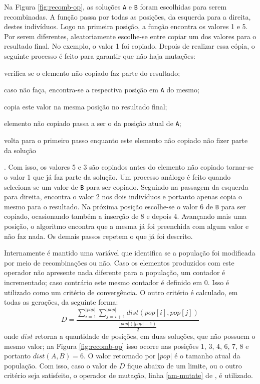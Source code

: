 Na Figura \ref{fig:recomb-op}, as soluções \verb!A! e \verb!B! foram
escolhidas para serem recombinadas. A função  passa
por todas as posições, da esquerda para a direita, destes
indivíduos. Logo na primeira posição, a função encontra os valores 1 e
5. Por serem diferentes, aleatoriamente escolhe-se entre copiar um dos
valores para o resultado final. No exemplo, o valor 1 foi
copiado. Depois de realizar essa cópia, o seguinte processo é feito
para garantir que não haja mutações: \begin{inparaenum}[(1)] \item
  verifica se o elemento não copiado faz parte do resultado; \item
  caso não faça, encontra-se a respectiva posição em \verb!A! do
  mesmo; \item copia este valor na mesma posição no resultado
  final; \item elemento não copiado passa a ser o da posição atual de
  \verb!A!; \item volta para o primeiro passo enquanto este elemento
  não copiado não fizer parte da solução\end{inparaenum}.
Com isso, os valores 5 e 3 são copiados antes do elemento não copiado
tornar-se o valor 1 que já faz parte da solução. Um processo análogo é
feito quando seleciona-se um valor de \verb!B! para ser
copiado. Seguindo na passagem da esquerda para direita,
 encontra o valor 2 nos dois indivíduos e portanto
apenas copia o mesmo para o resultado. Na próxima posição escolhe-se o
valor 6 de \verb!B! para ser copiado, ocasionando também a inserção de
8 e depois 4. Avançando mais uma posição, o algoritmo encontra que a
mesma já foi preenchida com algum valor e não faz nada. Os demais
passos repetem o que já foi descrito.

Internamente é mantido uma variável que identifica se a população foi
modificada por meio de recombinações ou não. Caso os elementos
produzidos com este operador não apresente nada diferente para a
população, um contador é incrementado; caso contrário este mesmo
contador é definido em 0. Isso é utilizado como um critério de
convergência. O outro critério é calculado, em todas as gerações, da
seguinte forma:
\begin{equation}\label{D}
D = \frac{\sum\limits_{i = 1}^{|pop|} \sum\limits_{j = i + 1}^{|pop|} dist(pop[i],
  pop[j])}{\frac{|pop| (|pop| - 1)}{2}}
\end{equation}
onde $dist$ retorna a quantidade de posições, em duas soluções, que
não possuem o mesmo valor; na Figura \ref{fig:recomb-op} isso ocorre
nas posições 1, 3, 4, 6, 7, 8 e portanto $dist(A, B) = 6$. O valor
retornado por $|pop|$ é o tamanho atual da população. Com isso, caso o
valor de $D$ fique abaixo de um limite, ou o outro critério seja
satisfeito, o operador de mutação, linha \ref{am-mutate} de
, é utilizado.

